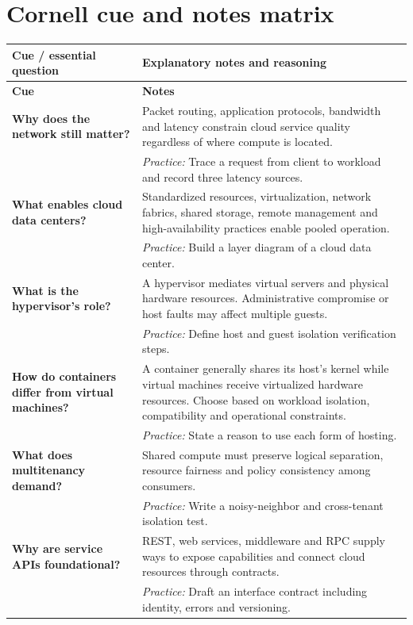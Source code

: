 \documentclass[10pt,letterpaper]{article}
\begin{document}
\section{Cornell cue and notes matrix}
\small\setlength{\LTleft}{0pt}\setlength{\LTright}{0pt plus 1fill}
\begin{longtable}{>{\RaggedRight\arraybackslash}p{}>{\RaggedRight\arraybackslash}p{}}
\toprule\textbf{Cue / essential question}&\textbf{Explanatory notes and reasoning}\\\midrule\endfirsthead\toprule\textbf{Cue}&\textbf{Notes}\\\midrule\endhead
\textbf{Why does the network still matter?} & Packet routing, application protocols, bandwidth and latency constrain cloud service quality regardless of where compute is located.\\[3pt]& \textcolor{petrol}{\emph{Practice:} Trace a request from client to workload and record three latency sources.}\\[8pt]\midrule
\textbf{What enables cloud data centers?} & Standardized resources, virtualization, network fabrics, shared storage, remote management and high-availability practices enable pooled operation.\\[3pt]& \textcolor{petrol}{\emph{Practice:} Build a layer diagram of a cloud data center.}\\[8pt]\midrule
\textbf{What is the hypervisor's role?} & A hypervisor mediates virtual servers and physical hardware resources. Administrative compromise or host faults may affect multiple guests.\\[3pt]& \textcolor{petrol}{\emph{Practice:} Define host and guest isolation verification steps.}\\[8pt]\midrule
\textbf{How do containers differ from virtual machines?} & A container generally shares its host's kernel while virtual machines receive virtualized hardware resources. Choose based on workload isolation, compatibility and operational constraints.\\[3pt]& \textcolor{petrol}{\emph{Practice:} State a reason to use each form of hosting.}\\[8pt]\midrule
\textbf{What does multitenancy demand?} & Shared compute must preserve logical separation, resource fairness and policy consistency among consumers.\\[3pt]& \textcolor{petrol}{\emph{Practice:} Write a noisy-neighbor and cross-tenant isolation test.}\\[8pt]\midrule
\textbf{Why are service APIs foundational?} & REST, web services, middleware and RPC supply ways to expose capabilities and connect cloud resources through contracts.\\[3pt]& \textcolor{petrol}{\emph{Practice:} Draft an interface contract including identity, errors and versioning.}\\[8pt]\midrule
\end{longtable}\normalsize
\end{document}
